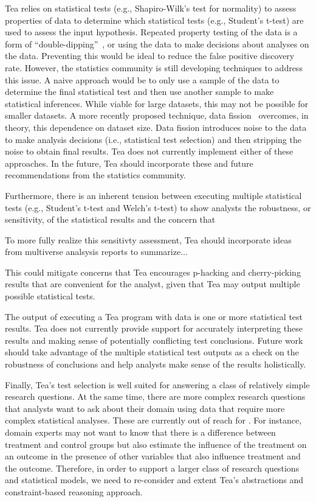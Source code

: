 Tea relies on statistical tests (e.g., Shapiro-Wilk's test for normality) to
assess properties of data to determine which statistical tests (e.g., Student's
t-test) are used to assess the input hypothesis. Repeated property testing of
the data is a form of ``double-dipping''~\cite{}, or using the data to make
decisions about analyses on the data. Preventing this would be ideal to reduce
the false positive discovery rate. However, the statistics community is still
developing techniques to address this issue. A naive approach would be to only
use a sample of the data to determine the final statistical test and then use
another sample to make statistical inferences. While viable for large datasets,
this may not be possible for smaller datasets. A more recently proposed
technique, data fission~\cite{} overcomes, in theory, this dependence on dataset
size.  Data fission introduces noise to the data to make analysis decisions
(i.e., statistical test selection) and then stripping the noise to obtain final
results. Tea does not currently implement either of these approaches. In the
future, Tea should incorporate these and future recommendations from the
statistics community. 

Furthermore, there is an inherent tension between executing multiple statistical
tests (e.g., Student's t-test and Welch's t-test) to show analysts the
robustness, or sensitivity, of the statistical results and the concern that

To more fully realize this sensitivty assessment, Tea should incorporate ideas
from multiverse analsysis reports to summarize...

This could mitigate concerns that Tea encourages p-hacking and cherry-picking
results that are convenient for the analyst, given that Tea may output multiple
possible statistical tests. 

The output of executing a Tea program with data is one or more
statistical test results. Tea does not currently provide support for accurately
interpreting these results and making sense of potentially conflicting test
conclusions. Future work should take advantage of the multiple statistical test
outputs as a check on the robustness of conclusions and help analysts make sense
of the results holistically. %

Finally, Tea's test selection is well suited for answering a class of relatively simple
research questions. At the same time, there are more complex research questions
that analysts want to ask about their domain using data that require more
complex statistical analyses. These are currently out of reach for \tea. For
instance, domain experts may not want to know that there is a difference between
treatment and control groups but also estimate the influence of the treatment on
an outcome in the presence of other variables that also influence treatment and
the outcome. Therefore, in order to support a larger class of research questions
and statistical models, we need to re-consider and extent Tea's abstractions and
constraint-based reasoning approach. 

